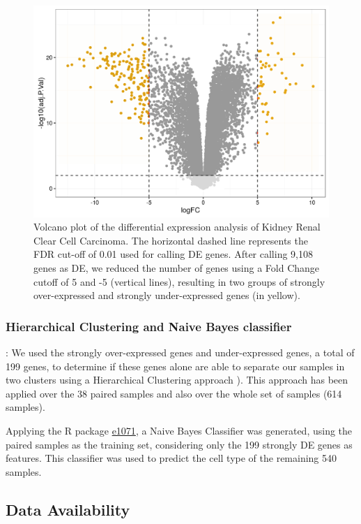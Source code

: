 \documentclass[9pt,twocolumn,twoside]{gsajnl}
\begin{document}
\begin{figure}[htbp]
\centering
\includegraphics[width=\linewidth]{figures/fig1_volcano.png}
\caption{Volcano plot of the differential expression analysis of Kidney Renal Clear Cell Carcinoma. The horizontal dashed line represents the FDR cut-off of 0.01 used for calling DE genes. After calling 9,108 genes as DE, we reduced the number of genes using a Fold Change cutoff of 5 and -5 (vertical lines), resulting in two groups of strongly over-expressed and strongly under-expressed genes (in yellow). }%
\label{fig:spectrum}
\end{figure}

\subsubsection*{Hierarchical Clustering and Naive Bayes classifier}
: We used the strongly over-expressed genes and under-expressed genes, a total of 199 genes, to determine if these genes alone are able to separate our samples in two clusters using a Hierarchical Clustering approach \citep{Spearman1904}). This approach has been applied over the 38 paired samples and also over the whole set of samples (614 samples).

Applying the R package \href{https://cran.r-project.org/web/packages/e1071/index.html}{e1071}, a Naive Bayes Classifier \citep{Smyth2004} was generated, using the paired samples as the training set, considering only the 199 strongly DE genes as features. This classifier was used to predict the cell type of the remaining 540 samples. 

\subsection*{Data Availability}
\end{document}
